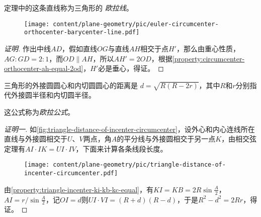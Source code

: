 定理中的这条直线称为三角形的 \emph{欧拉线}。

\begin{figure}[htbp]
\centering
\texttt{[image: content/plane-geometry/pic/euler-circumcenter-orthocenter-barycenter-line.pdf]}
\caption{}
\label{fig:euler-circumcenter-orthocenter-barycenter-line}
\end{figure}

\begin{proof}[证明]
  作出中线$AD$，假如直线$OG$与直线$AH$相交于点$H'$，那么由重心性质，$AG:GD=2:1$，而$OD \parallel AH$，所以$AH'=2OD$，根据\autoref{property:circumcenter-orthocenter-ah-equal-2od}，$H'$必是垂心，得证。
\end{proof}

\begin{theorem}
  三角形的外接圆圆心和内切圆圆心的距离是 $d=\sqrt{R(R-2r)}$，其中$R$和$r$分别指代外接圆半径和内切圆半径。
\end{theorem}

这公式称为\emph{欧拉公式}。

\begin{proof}[证明一]
  如\autoref{fig:triangle-distance-of-incenter-circumcenter}，设外心和内心连线所在直线与外接圆相交于$U$、$V$两点，角$A$的平分线与外接圆相交于另一点$K$，由相交弦定理有$AI \cdot IK = UI \cdot IV$，下面来计算各条线段长度。
 
\begin{figure}[htbp]
\centering
\texttt{[image: content/plane-geometry/pic/triangle-distance-of-incenter-circumcenter.pdf]}
\caption{}
\label{fig:triangle-distance-of-incenter-circumcenter}
\end{figure}

由\autoref{property:triangle-incenter-ki-kb-kc-equal}，有$KI=KB=2R\sin{\frac{A}{2}}$，$AI=r/ \sin{\frac{A}{2}}$，记$OI=d$则$UI\cdot VI=(R+d)(R-d)$，于是$R^2-d^2=2Rr$，得证。
\end{proof}

